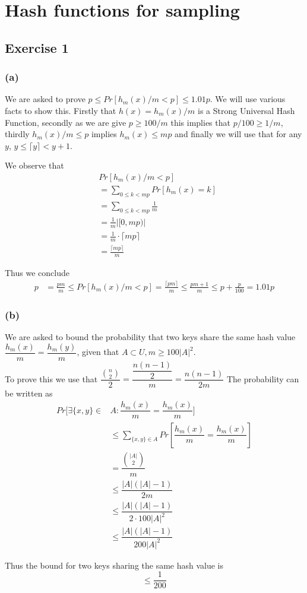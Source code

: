 \section{Hash functions for sampling}
\subsection{Exercise 1}
\subsubsection{(a)}

We are asked to prove \(p \leq Pr[h_m(x)/m < p] \leq 1.01p\).
We will use various facts to show this. Firstly that \(h(x) = h_m(x)/m\) is a Strong Universal Hash Function, secondly as we are give \(p \ge 100/m \) this implies that \(p/100\ge 1/m\), thirdly \(h_m(x)/m \le p \) implies \(h_m(x) \le mp  \)  and finally we will use that for any \(y\), \(y \leq \lceil y \rceil < y+1\).

We observe that
\begin{align*}
	& Pr[h_m(x)/m < p] \\
	&= \sum_{0 \leq k < mp} Pr[h_m(x) = k] \\
	&= \sum_{0 \leq k < mp} \frac{1}{m} \\
	&= \frac{1}{m} \left| [0,mp) \right| \\
	&= \frac{1}{m} \cdot \lceil mp \rceil \\
	&= \frac{\lceil mp \rceil}{m}
\end{align*}

Thus we conclude
\begin{align*}
	p 	&= \frac{pm}{m} \leq Pr[h_m(x)/m < p] = \frac{\lceil pm \rceil}{m} \leq \frac{pm+1}{m} 
		\leq p + \frac{p}{100} = 1.01p
\end{align*}

\subsubsection{(b)}
We are asked to bound the probability that two keys share the same hash value \(\dfrac{h_m(x)}{m}=\dfrac{h_m(y)}{m}\), given that \(A\subset U, m \geq 100|A|^2\).\\
To prove this we use that \(\dfrac{\binom{n}{2}}{2} = \dfrac{\dfrac{n(n-1)}{2}}{m} = \dfrac{n(n-1)}{2m}\)
The probability can be written as
\begin{align*}
  Pr[\exists \{x,y\}\in &A: \dfrac{h_m(x)}{m} = \dfrac{h_m(x)}{m}]\\
  &\leq\sum_{\{x,y\}\in A} Pr\left [\dfrac{h_m(x)}{m} = \dfrac{h_m(x)}{m}\right ]\\
  &=\dfrac{\binom{|A|}{2}}{m}\\
  &\leq\dfrac{|A|(|A| - 1)}{2m}\\
  &\leq\dfrac{|A|(|A| - 1)}{2\cdot 100|A|^2}\\
  &\leq\dfrac{|A|(|A| - 1)}{200|A|^2}
\end{align*}

Thus the bound for two keys sharing the same hash value is \[\leq\dfrac{1}{200}\]
